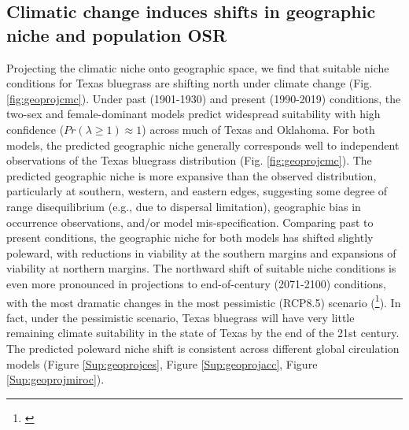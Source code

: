 \documentclass[12pt]{article}\usepackage[]{graphicx}\usepackage[dvipsnames]{xcolor}
\newcommand{\jacob}[2]{{\color{blue}{#1}}\footnote{\textit{\color{blue}{#2}}}}
\begin{document}
\subsection*{Climatic change induces shifts in geographic niche and population OSR}
Projecting the climatic niche onto geographic space, we find that suitable niche conditions for Texas bluegrass are shifting north under climate change (Fig. \ref{fig:geoprojcmc}). 
Under past (1901-1930) and present (1990-2019) conditions, the two-sex and female-dominant models predict widespread suitability with high confidence ($Pr(\lambda \ge 1) \approx 1$) across much of Texas and Oklahoma. 
For both models, the predicted geographic niche generally corresponds well to independent observations of the Texas bluegrass distribution (Fig. \ref{fig:geoprojcmc}).
The predicted geographic niche is more expansive than the observed distribution, particularly at southern, western, and eastern edges, suggesting some degree of range disequilibrium (e.g., due to dispersal limitation), geographic bias in occurrence observations, and/or model mis-specification. 
Comparing past to present conditions, the geographic niche for both models has shifted slightly poleward, with reductions in viability at the southern margins and expansions of viability at northern margins. 
The northward shift of suitable niche conditions is even more pronounced in projections to end-of-century (2071-2100) conditions, with the most dramatic changes in the most pessimistic (RCP8.5) scenario (\jacob{Fig. \ref{fig:geoprojcmc}.}{I am not sure if we need title for each panel. }). 
In fact, under the pessimistic scenario, Texas bluegrass will have very little remaining climate suitability in the state of Texas by the end of the 21st century. 
The predicted poleward niche shift is consistent across different global circulation models (Figure \ref{Sup:geoprojces}, Figure \ref{Sup:geoprojacc}, Figure \ref{Sup:geoprojmiroc}). 
\end{document}
